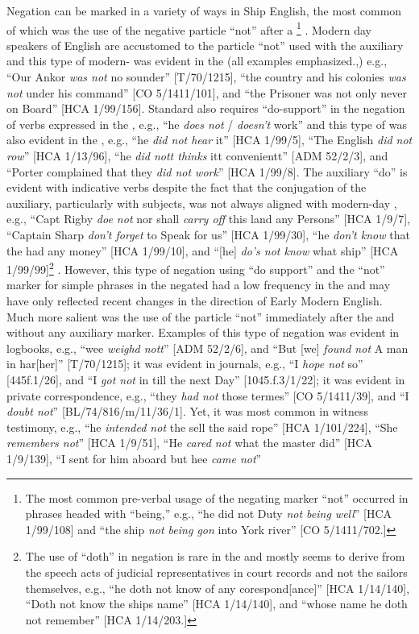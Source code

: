 Negation can be marked in a variety of ways in Ship English, the most common of which was the use of the negative particle “not” after a \footnote{The most common pre-verbal usage of the negating marker “not” occurred in phrases headed with “being,” e.g., “he did not Duty \textit{not being well}” [HCA 1/99/108] and “the  ship \textit{not being gon} into York river” [CO 5/1411/702.]} . Modern day speakers of English are accustomed to the particle “not” used with the auxiliary  and this type of modern- was evident in the  (all examples emphasized.,) e.g., “Our Ankor \textit{was not} no sounder” [T/70/1215], “the country and his colonies \textit{was not} under his command” [CO 5/1411/101], and “the Prisoner was not only never on Board” [HCA 1/99/156]. Standard  also requires “do-support” in the negation of verbs expressed in the  , e.g., “he \textit{does not} / \textit{doesn’t} work” and this type of  was also evident in the , e.g., “he \textit{did not hear} it” [HCA 1/99/5], “The English \textit{did not row}” [HCA 1/13/96], “he \textit{did nott thinks} itt convenientt” [ADM 52/2/3], and “Porter complained that they \textit{did not work}” [HCA 1/99/8]. The auxiliary “do” is evident with indicative verbs despite the fact that the conjugation of the auxiliary, particularly with  subjects, was not always aligned with modern-day , e.g., “Capt Rigby \textit{doe not} nor shall \textit{carry off} this land any Persons” [HCA 1/9/7], “Captain Sharp \textit{don’t forget} to Speak for us” [HCA 1/99/30], “he \textit{don’t know} that the  had any money” [HCA 1/99/10], and “[he] \textit{do’s not know} what ship” [HCA 1/99/99]\footnote{The use of “doth” in negation is rare in the  and mostly seems to derive from the speech acts of judicial representatives in court records and not the sailors themselves, e.g., “he doth not know of any corespond[ance]” [HCA 1/14/140], “Doth not know the ships name” [HCA 1/14/140], and “whose name he doth not remember” [HCA 1/14/203.]} . However, this type of negation using “do support” and the “not” marker for simple  phrases in the negated  had a low frequency in the  and may have only reflected recent changes in the direction of Early Modern English. Much more salient was the use of the particle “not” immediately after the  and without any auxiliary marker. Examples of this type of negation was evident in logbooks, e.g., “wee \textit{weighd nott}” [ADM 52/2/6], and “But [we] \textit{found not} A man in har[her]” [T/70/1215]; it was evident in journals, e.g., “I \textit{hope not} so” [445f.1/26], and “I \textit{got not} in till the next Day” [1045.f.3/1/22]; it was evident in private correspondence, e.g., “they \textit{had not} those termes” [CO 5/1411/39], and “I \textit{doubt not}” [BL/74/816/m/11/36/1]. Yet, it was most common in witness testimony, e.g., “he \textit{intended not} the sell the said rope” [HCA 1/101/224], “She \textit{remembers not}” [HCA 1/9/51], “He \textit{cared not} what the master did” [HCA 1/9/139], “I sent for him aboard but hee \textit{came not}” 